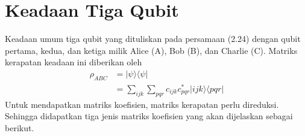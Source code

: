 \section{Keadaan Tiga Qubit}
Keadaan umum tiga qubit yang dituliskan pada persamaan (2.24) dengan qubit pertama, kedua, dan ketiga milik Alice (A), Bob (B), dan Charlie (C). Matriks kerapatan keadaan ini diberikan oleh
\begin{equation}
	\begin{aligned}
		\rho_{ABC}
		&= |\psi\rangle \langle \psi| \\
		&= \sum_{i j k} \sum_{p q r}
		c_{i j k} c^{*}_{p q r}
		| i j k \rangle \langle p q r |
	\end{aligned} \label{matrikskerapatan3qubit}
\end{equation}
Untuk mendapatkan matriks koefisien, matriks kerapatan perlu direduksi. Sehingga didapatkan tiga jenis matriks koefisien yang akan dijelaskan sebagai berikut.

